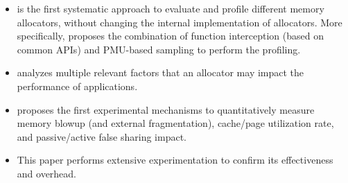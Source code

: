 \begin{itemize}
\item \MP{} is the first systematic approach to evaluate and profile different memory allocators, without changing the internal implementation of allocators. More specifically, \MP{} proposes the combination of function interception (based on common APIs) and PMU-based sampling to perform the profiling.


\item \MP{} analyzes multiple relevant factors that an allocator may impact the performance of applications.

\item \MP{} proposes the first experimental mechanisms to quantitatively measure memory blowup (and external fragmentation), cache/page utilization rate, and passive/active false sharing impact. 
\item This paper performs extensive experimentation to confirm its effectiveness and overhead.    

\end{itemize} 

